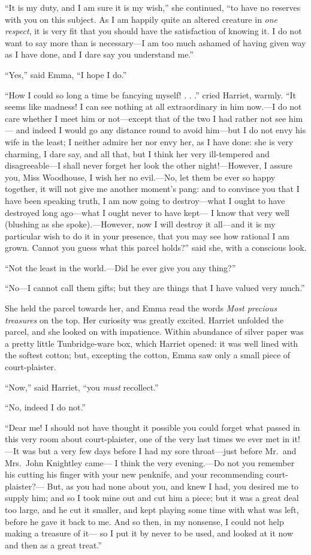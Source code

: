 ``It is my duty, and I am sure it is my wish,'' she continued,
``to have no reserves with you on this subject.  As I am happily
quite an altered creature in \emph{one respect}, it is very fit that you
should have the satisfaction of knowing it.  I do not want to say
more than is necessary---I am too much ashamed of having given way
as I have done, and I dare say you understand me.''

``Yes,'' said Emma, ``I hope I do.''

``How I could so long a time be fancying myself! . . .''
cried Harriet, warmly.  ``It seems like madness!  I can see nothing
at all extraordinary in him now.---I do not care whether I meet
him or not---except that of the two I had rather not see him---%
and indeed I would go any distance round to avoid him---but I do
not envy his wife in the least; I neither admire her nor envy her,
as I have done:  she is very charming, I dare say, and all that,
but I think her very ill-tempered and disagreeable---I shall never forget
her look the other night!---However, I assure you, Miss Woodhouse,
I wish her no evil.---No, let them be ever so happy together,
it will not give me another moment's pang:  and to convince you
that I have been speaking truth, I am now going to destroy---what I
ought to have destroyed long ago---what I ought never to have kept---%
I know that very well (blushing as she spoke).---However, now I
will destroy it all---and it is my particular wish to do it
in your presence, that you may see how rational I am grown.
Cannot you guess what this parcel holds?'' said she, with a conscious look.

``Not the least in the world.---Did he ever give you any thing?''

``No---I cannot call them gifts; but they are things that I have
valued very much.''

She held the parcel towards her, and Emma read the words \emph{Most
precious treasures} on the top.  Her curiosity was greatly excited.
Harriet unfolded the parcel, and she looked on with impatience.
Within abundance of silver paper was a pretty little Tunbridge-ware box,
which Harriet opened:  it was well lined with the softest cotton;
but, excepting the cotton, Emma saw only a small piece of court-plaister.

``Now,'' said Harriet, ``you \emph{must} recollect.''

``No, indeed I do not.''

``Dear me!  I should not have thought it possible you could forget
what passed in this very room about court-plaister, one of the very
last times we ever met in it!---It was but a very few days before I
had my sore throat---just before Mr.\ and Mrs.\ John Knightley came---%
I think the very evening.---Do not you remember his cutting his finger
with your new penknife, and your recommending court-plaister?---%
But, as you had none about you, and knew I had, you desired
me to supply him; and so I took mine out and cut him a piece;
but it was a great deal too large, and he cut it smaller, and kept
playing some time with what was left, before he gave it back to me.
And so then, in my nonsense, I could not help making a treasure of it---%
so I put it by never to be used, and looked at it now and then
as a great treat.''

